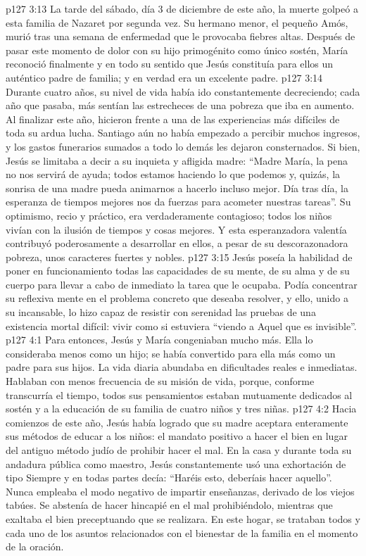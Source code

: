 \vs p127 3:13 \pc La tarde del sábado, día 3 de diciembre de este año, la muerte golpeó a esta familia de Nazaret por segunda vez. Su hermano menor, el pequeño Amós, murió tras una semana de enfermedad que le provocaba fiebres altas. Después de pasar este momento de dolor con su hijo primogénito como único sostén, María reconoció finalmente y en todo su sentido que Jesús constituía para ellos un auténtico padre de familia; y en verdad era un excelente padre.
\vs p127 3:14 Durante cuatro años, su nivel de vida había ido constantemente decreciendo; cada año que pasaba, más sentían las estrecheces de una pobreza que iba en aumento. Al finalizar este año, hicieron frente a una de las experiencias más difíciles de toda su ardua lucha. Santiago aún no había empezado a percibir muchos ingresos, y los gastos funerarios sumados a todo lo demás les dejaron consternados. Si bien, Jesús se limitaba a decir a su inquieta y afligida madre: “Madre María, la pena no nos servirá de ayuda; todos estamos haciendo lo que podemos y, quizás, la sonrisa de una madre pueda animarnos a hacerlo incluso mejor. Día tras día, la esperanza de tiempos mejores nos da fuerzas para acometer nuestras tareas”. Su optimismo, recio y práctico, era verdaderamente contagioso; todos los niños vivían con la ilusión de tiempos y cosas mejores. Y esta esperanzadora valentía contribuyó poderosamente a desarrollar en ellos, a pesar de su descorazonadora pobreza, unos caracteres fuertes y nobles.
\vs p127 3:15 Jesús poseía la habilidad de poner en funcionamiento todas las capacidades de su mente, de su alma y de su cuerpo para llevar a cabo de inmediato la tarea que le ocupaba. Podía concentrar su reflexiva mente en el problema concreto que deseaba resolver, y ello, unido a su  incansable, lo hizo capaz de resistir con serenidad las pruebas de una existencia mortal difícil: vivir como si estuviera “viendo a Aquel que es invisible”.
\vs p127 4:1 Para entonces, Jesús y María congeniaban mucho más. Ella lo consideraba menos como un hijo; se había convertido para ella más como un padre para sus hijos. La vida diaria abundaba en dificultades reales e inmediatas. Hablaban con menos frecuencia de su misión de vida, porque, conforme transcurría el tiempo, todos sus pensamientos estaban mutuamente dedicados al sostén y a la educación de su familia de cuatro niños y tres niñas.
\vs p127 4:2 Hacia comienzos de este año, Jesús había logrado que su madre aceptara enteramente sus métodos de educar a los niños: el mandato positivo a hacer el bien en lugar del antiguo método judío de prohibir hacer el mal. En la casa y durante toda su andadura pública como maestro, Jesús constantemente usó una exhortación de tipo  Siempre y en todas partes decía: “Haréis esto, deberíais hacer aquello”. Nunca empleaba el modo negativo de impartir enseñanzas, derivado de los viejos tabúes. Se abstenía de hacer hincapié en el mal prohibiéndolo, mientras que exaltaba el bien preceptuando que se realizara. En este hogar, se trataban todos y cada uno de los asuntos relacionados con el bienestar de la familia en el momento de la oración.
